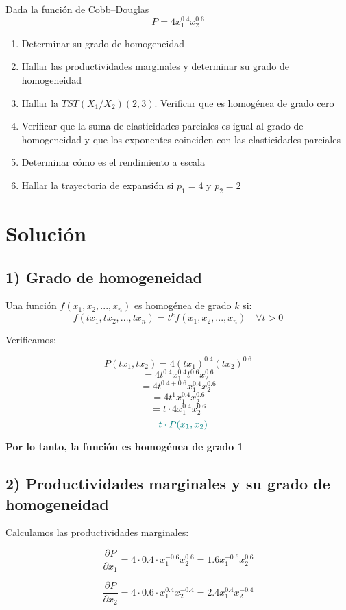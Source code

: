 \documentclass{article}
\begin{document}
Dada la función de Cobb–Douglas
\[
P = 4x_1^{0.4}x_2^{0.6}
\]

\begin{enumerate}
  \item Determinar su grado de homogeneidad
  \item Hallar las productividades marginales y determinar su grado de homogeneidad
  \item Hallar la \(TST(X_1/X_2)(2,3)\). Verificar que es homogénea de grado cero
  \item Verificar que la suma de elasticidades parciales es igual al grado de homogeneidad y que los exponentes coinciden con las elasticidades parciales
  \item Determinar cómo es el rendimiento a escala
  \item Hallar la trayectoria de expansión si \(p_1 = 4\) y \(p_2 = 2\)
\end{enumerate}

\newpage
\section*{Solución}

\subsection*{1) Grado de homogeneidad}

Una función \(f(x_1,x_2,...,x_n)\) es homogénea de grado \(k\) si:
\[
f(tx_1,tx_2,...,tx_n) = t^k f(x_1,x_2,...,x_n) \quad \forall t > 0
\]

Verificamos:

\[
P(tx_1, tx_2) = 4(tx_1)^{0.4}(tx_2)^{0.6}
\]
\[
= 4t^{0.4}x_1^{0.4}t^{0.6}x_2^{0.6}
\]
\[
= 4t^{0.4+0.6}x_1^{0.4}x_2^{0.6}
\]
\[
= 4t^1x_1^{0.4}x_2^{0.6}
\]
\[
= t \cdot 4x_1^{0.4}x_2^{0.6}
\]
\[
\color{teal}
= t \cdot P(x_1,x_2)
\]

\textbf{\color{teal}Por lo tanto, la función es homogénea de grado 1}

\subsection*{2) Productividades marginales y su grado de homogeneidad}

Calculamos las productividades marginales:

\[
\frac{\partial P}{\partial x_1} = 4 \cdot 0.4 \cdot x_1^{-0.6}x_2^{0.6}
= 1.6x_1^{-0.6}x_2^{0.6}
\]

\[
\frac{\partial P}{\partial x_2} = 4 \cdot 0.6 \cdot x_1^{0.4}x_2^{-0.4}
= 2.4x_1^{0.4}x_2^{-0.4}
\]
\end{document}
